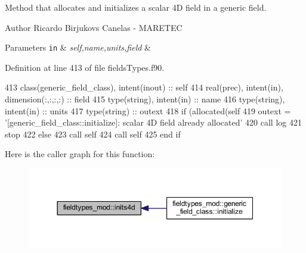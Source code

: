 Method that allocates and initializes a scalar 4D field in a generic field. 

\begin{DoxyAuthor}{Author}
Ricardo Birjukovs Canelas -\/ M\+A\+R\+E\+T\+EC 
\end{DoxyAuthor}

\begin{DoxyParams}[1]{Parameters}
\mbox{\tt in}  & {\em self,name,units,field} & \\
\hline
\end{DoxyParams}


Definition at line 413 of file fields\+Types.\+f90.


\begin{DoxyCode}
413     \textcolor{keywordtype}{class}(generic\_field\_class), \textcolor{keywordtype}{intent(inout)} :: self
414     \textcolor{keywordtype}{real(prec)}, \textcolor{keywordtype}{intent(in)}, \textcolor{keywordtype}{dimension(:,:,:,:)} :: field
415     \textcolor{keywordtype}{type}(string), \textcolor{keywordtype}{intent(in)} :: name
416     \textcolor{keywordtype}{type}(string), \textcolor{keywordtype}{intent(in)} :: units
417     \textcolor{keywordtype}{type}(string) :: outext
418     \textcolor{keywordflow}{if} (\textcolor{keyword}{allocated}(self%
419         outext = \textcolor{stringliteral}{'[generic\_field\_class::initialize]: scalar 4D field already allocated'}
420         \textcolor{keyword}{call }log%
421         stop
422     \textcolor{keywordflow}{else}
423         \textcolor{keyword}{call }self%
424         \textcolor{keyword}{call }self%
425 \textcolor{keywordflow}{    end if}
\end{DoxyCode}
Here is the caller graph for this function\+:\nopagebreak
\begin{figure}[H]
\begin{center}
\leavevmode
\includegraphics[width=350pt]{namespacefieldtypes__mod_a1987bd94293cfd9e35016ac5992501cd_icgraph}
\end{center}
\end{figure}
\mbox{\label{namespacefieldtypes__mod_a96ff5318da6a7db8bb61c525315c1c89}} 
